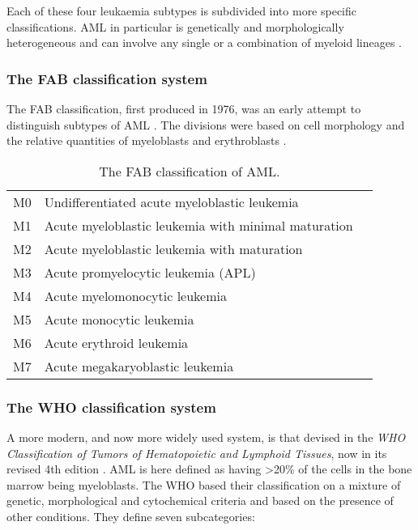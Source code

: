 Each of these four leukaemia subtypes is subdivided into more specific classifications. \ac{AML} in particular is genetically and morphologically heterogeneous and can involve any single or a combination of myeloid lineages \citep{whoclassification, Kouchkovsky2016}. 

\subsubsection{The FAB classification system}
The \ac{FAB} classification, first produced in 1976, was an early attempt to distinguish subtypes of \ac{AML} \citep{bennett1976proposals}. The divisions were based on cell morphology and the relative quantities of myeloblasts and erythroblasts \citep{ACS2018}.

\begin{table}[h]
\centering
\caption{The FAB classification of AML.}
\label{tab:FABclassification}
\begin{tabular}{lll}
\hline
M0 & Undifferentiated acute myeloblastic leukemia        &  \\ 
M1 & Acute myeloblastic leukemia with minimal maturation &  \\
M2 & Acute myeloblastic leukemia with maturation         &  \\
M3 & Acute promyelocytic leukemia (APL)                  &  \\
M4 & Acute myelomonocytic leukemia                       &  \\
M5 & Acute monocytic leukemia                            &  \\
M6 & Acute erythroid leukemia                            &  \\
M7 & Acute megakaryoblastic leukemia                     &  \\ \hline
\end{tabular}
\end{table}


\subsubsection{The WHO classification system}

A more modern, and now more widely used system, is that devised in the \textit{\ac{WHO} Classification of Tumors of Hematopoietic and Lymphoid Tissues}, now in its revised 4th edition \citep{whoclassification}. \ac{AML} is here defined as having >20\% of the cells in the bone marrow being myeloblasts. The \ac{WHO} based their classification on a mixture of genetic, morphological and cytochemical criteria and based on the presence of other conditions. They define seven subcategories:

